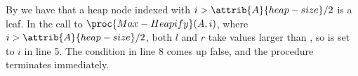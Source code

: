 By  we have that a heap node indexed with $i>\attrib{A}{heap-size}/2$ is a leaf.
In the call to $\proc{Max-Heapify}(A,i)$, where $i>\attrib{A}{heap-size}/2$, both $l$ and $r$ take values larger than , so  is set to $i$ in line 5.
The condition in line 8 comes up false, and the procedure terminates immediately.
